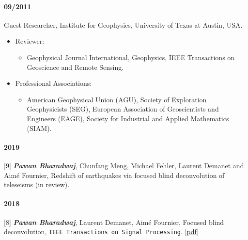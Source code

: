 \documentclass[9pt]{developercv} %
\def\tightlist{}
\providecommand{\tightlist}{%
  \setlength{\itemsep}{0pt}\setlength{\parskip}{0pt}}
\begin{document}
\paragraph{09/2011}\label{section-18}

Guest
Researcher,
Institute
for
Geophysics,
University
of Texas
at Austin,
USA.

\label{service}

\begin{itemize}
\tightlist
\item
  Reviewer:

  \begin{itemize}
  \tightlist
  \item
    Geophysical
    Journal
    International,
    Geophysics,
    IEEE
    Transactions
    on
    Geoscience
    and
    Remote
    Sensing.
  \end{itemize}
\item
  Professional
  Associations:

  \begin{itemize}
  \tightlist
  \item
    American
    Geophysical
    Union
    (AGU),
    Society
    of
    Exploration
    Geophysicists
    (SEG),
    European
    Association
    of
    Geoscientists
    and
    Engineers
    (EAGE),
    Society
    for
    Industrial
    and
    Applied
    Mathematics
    (SIAM).
  \end{itemize}
\end{itemize}

\label{peer-reviewed-journal-articles}

\paragraph{2019}\label{section-19}

{[}9{]}
\textbf{\emph{Pawan
Bharadwaj}},
Chunfang
Meng,
Michael
Fehler,
Laurent
Demanet
and Aimé
Fournier,
Redshift
of
earthquakes
via
focused
blind
deconvolution
of
teleseisms
(in
review).

\paragraph{2018}\label{section-20}

{[}8{]}
\textbf{\emph{Pawan
Bharadwaj}},
Laurent
Demanet,
Aimé
Fournier,
Focused
blind
deconvolution,
\texttt{IEEE\ Transactions\ on\ Signal\ Processing}.
\href{https://github.com/pawbz/pawbz.github.io/blob/src/pdf/papers/Bharadwaj_FBD_arXiv1.pdf}{{[}pdf{]}}
\end{document}
